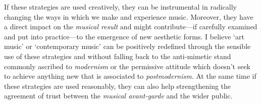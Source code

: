 
If these strategies are used creatively, they can be instrumental in radically changing the ways in which we make and experience music. Moreover, they have a direct impact on the \emph{musical result} and might contribute---if carefully examined and put into practice---to the emergence of new aesthetic forms. I believe `art music' or `contemporary music' can be positively redefined through the sensible use of these strategies and without falling back to the anti-mimetic stand commonly ascribed to \emph{modernism} or the permissive attitude which doesn't seek to achieve anything new that is associated to \emph{postmodernism}. At the same time if these strategies are used reasonably, they can also help strengthening the agreement of trust between the \emph{musical avant-garde} and the wider public.

